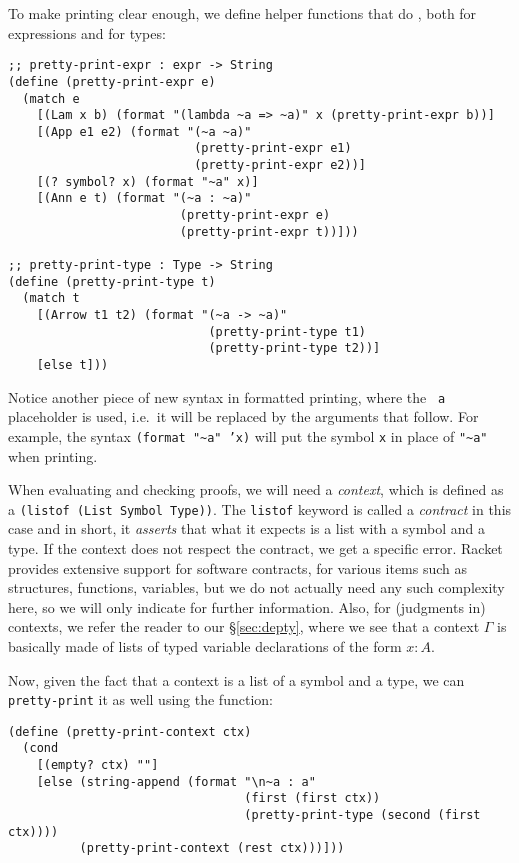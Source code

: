 To make printing clear enough, we define helper functions that do
, both for expressions and for types:
{
  \small
\begin{verbatim}
;; pretty-print-expr : expr -> String
(define (pretty-print-expr e)
  (match e
    [(Lam x b) (format "(lambda ~a => ~a)" x (pretty-print-expr b))]
    [(App e1 e2) (format "(~a ~a)"
                          (pretty-print-expr e1)
                          (pretty-print-expr e2))]
    [(? symbol? x) (format "~a" x)]
    [(Ann e t) (format "(~a : ~a)"
                        (pretty-print-expr e)
                        (pretty-print-expr t))]))

;; pretty-print-type : Type -> String
(define (pretty-print-type t)
  (match t
    [(Arrow t1 t2) (format "(~a -> ~a)"
                            (pretty-print-type t1)
                            (pretty-print-type t2))]
    [else t]))
\end{verbatim}
}

Notice another piece of new syntax in formatted printing,
where the \texttt{~a} placeholder is used, i.e.\ it will be
replaced by the arguments that follow. For example, the syntax
\texttt{(format "\~\!a" 'x)} will put the symbol \texttt{x}
in place of \texttt{"\~\!a"} when printing.

When evaluating and checking proofs, we will need a \emph{context},
which is defined as a \texttt{(listof (List Symbol Type))}. The
\texttt{listof} keyword is called a \emph{contract} in this case and
in short, it \emph{asserts} that what it expects is a list with a
symbol and a type. If the context does not respect the contract,
we get a specific error. Racket provides extensive support for software
contracts, for various items such as structures, functions, variables,
but we do not actually need any such complexity here, so we will
only indicate \cite{contract} for further information. Also, for
(judgments in) contexts, we refer the reader to our \S\ref{sec:depty},
where we see that a context $ \Gamma $ is basically made of lists of
typed variable declarations of the form $ x : A $.

Now, given the fact that a context is a list of a symbol and a type,
we can \texttt{pretty-print} it as well using the function:
{
  \small
\begin{verbatim}
(define (pretty-print-context ctx)
  (cond
    [(empty? ctx) ""]
    [else (string-append (format "\n~a : a"
                                 (first (first ctx))
                                 (pretty-print-type (second (first ctx))))
          (pretty-print-context (rest ctx)))]))
\end{verbatim}
}

